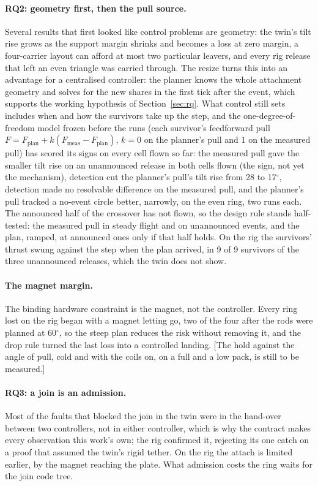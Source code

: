 \paragraph{RQ2: geometry first, then the pull source.} Several results that first looked like control problems
are geometry: the twin's tilt rise grows as the support margin shrinks and becomes a loss at zero margin, a four-carrier
layout can afford at most two particular leavers, and every rig release that left an even triangle was carried
through. The resize turns this into an advantage for a centralised controller: the planner knows the whole attachment
geometry and solves for the new shares in the first tick after the event, which supports the working hypothesis of
Section~\ref{sec:rq}. What control still sets includes when and how the survivors take up the step, and the one-degree-of-freedom
model frozen before the runs (each survivor's feedforward pull $F = F_{\mathrm{plan}} + k(F_{\mathrm{meas}} -
F_{\mathrm{plan}})$, $k = 0$ on the planner's pull and 1 on the measured pull) has scored its signs on every cell flown so
far: the measured pull gave the smaller tilt rise on an unannounced release in both cells flown (the sign, not yet the
mechanism), detection cut the planner's pull's tilt rise from 28 to 17$^\circ$, detection made no resolvable difference on the measured pull, and the planner's pull tracked a no-event circle
better, narrowly, on the even ring, two runs each. The announced half of the crossover has not flown, so the design rule stands half-tested: the
measured pull in steady flight and on unannounced events, and the plan, ramped, at announced ones only if that half
holds. On the rig the survivors' thrust swung against the step when the plan arrived, in 9 of 9 survivors of the
three unannounced releases, which the twin does not show.

\paragraph{The magnet margin.} The binding hardware constraint is the magnet, not the controller. Every ring lost on
the rig began with a magnet letting go, two of the four after the rods were planned at 60$^\circ$, so the steep plan
reduces the risk without removing it, and the drop rule turned the last loss into a controlled landing. [The hold
against the angle of pull, cold and with the coils on, on a full and a low pack, is still to be measured.]

\paragraph{RQ3: a join is an admission.} Most of the faults that blocked the join in the twin were in the hand-over
between two controllers, not in either controller, which is why the contract makes every observation this work's own;
the rig confirmed it, rejecting its one catch on a proof that assumed the twin's rigid tether. On the rig the attach is
limited earlier, by the magnet reaching the plate. What admission costs the ring waits for the join code tree.

